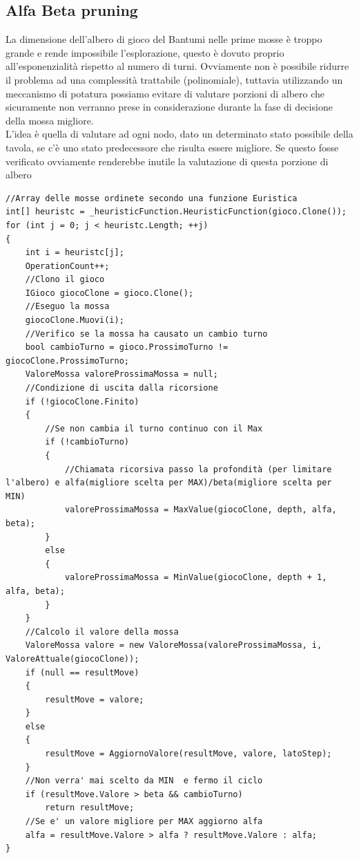 \documentclass[paper=a4, fontsize=11pt]{scrartcl}	%
\numberwithin{equation}{section}															%
\numberwithin{figure}{section}																%
\numberwithin{table}{section}																%
\begin{document}
\subsection{Alfa Beta pruning}
La dimensione dell'albero di gioco del Bantumi nelle prime mosse \`e troppo grande e rende impossibile l'esplorazione, questo \`e dovuto proprio all'esponenzialit\`a rispetto al numero di turni. Ovviamente non \`e possibile ridurre il problema ad una complessit\`a trattabile (polinomiale), tuttavia utilizzando un meccanismo di potatura possiamo evitare di valutare porzioni di albero che sicuramente non verranno prese in considerazione durante la fase di decisione della mossa migliore.\\ 
L'idea \`e quella di valutare ad ogni nodo, dato un determinato stato possibile della tavola, se c'\`e uno stato predecessore che risulta essere migliore. Se questo fosse verificato ovviamente renderebbe inutile la valutazione di questa porzione di albero
\lstset{style=sharpc}
\begin{lstlisting}[label=maxPruning,caption=Implementazione Max con taglio]
//Array delle mosse ordinete secondo una funzione Euristica
int[] heuristc = _heuristicFunction.HeuristicFunction(gioco.Clone());
for (int j = 0; j < heuristc.Length; ++j)
{
    int i = heuristc[j];
    OperationCount++;
	//Clono il gioco
    IGioco giocoClone = gioco.Clone();
	//Eseguo la mossa
    giocoClone.Muovi(i);
	//Verifico se la mossa ha causato un cambio turno
    bool cambioTurno = gioco.ProssimoTurno != giocoClone.ProssimoTurno;
    ValoreMossa valoreProssimaMossa = null;
	//Condizione di uscita dalla ricorsione
    if (!giocoClone.Finito)
    {
		//Se non cambia il turno continuo con il Max
        if (!cambioTurno)
		{
			//Chiamata ricorsiva passo la profondità (per limitare l'albero) e alfa(migliore scelta per MAX)/beta(migliore scelta per MIN)
            valoreProssimaMossa = MaxValue(giocoClone, depth, alfa, beta);
		}
        else
		{
            valoreProssimaMossa = MinValue(giocoClone, depth + 1, alfa, beta);
		}
    }
	//Calcolo il valore della mossa	
    ValoreMossa valore = new ValoreMossa(valoreProssimaMossa, i, ValoreAttuale(giocoClone));
    if (null == resultMove)
    {
        resultMove = valore;
    }
    else
    {
        resultMove = AggiornoValore(resultMove, valore, latoStep);
    }
	//Non verra' mai scelto da MIN  e fermo il ciclo
    if (resultMove.Valore > beta && cambioTurno)
        return resultMove;
	//Se e' un valore migliore per MAX aggiorno alfa
    alfa = resultMove.Valore > alfa ? resultMove.Valore : alfa;
}\end{lstlisting}
\end{document}
